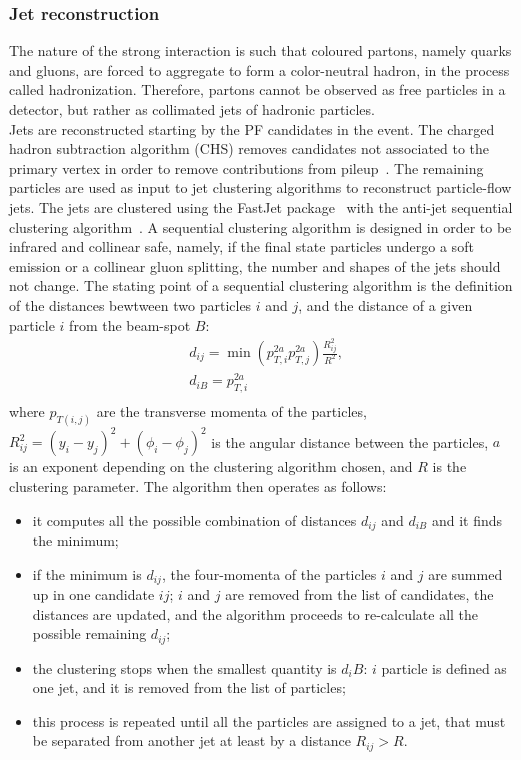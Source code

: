 \subsubsection{Jet reconstruction}
The nature of the strong interaction is such that coloured partons, namely quarks and gluons, are forced to aggregate to form a color-neutral hadron, in the process called hadronization. Therefore, partons cannot be observed as free particles in a detector, but rather as collimated jets of hadronic particles.\\
Jets are reconstructed starting by the PF candidates in the event. The charged hadron subtraction algorithm (CHS) removes candidates not associated to the primary vertex in order to remove contributions from pileup~\cite{CMS-PAS-JME-14-001}. The remaining particles are used as input to jet clustering algorithms
to reconstruct particle-flow jets. The jets are clustered using the {\sc FastJet} package~\cite{bib:fastjet} with the anti-\kt jet sequential clustering algorithm~\cite{Cacciari:2008gp}. A sequential clustering algorithm is designed in order to be infrared and collinear safe, namely, if the final state particles undergo a soft emission or a collinear gluon splitting, the number and shapes of the jets should not change. The stating point of a sequential clustering algorithm is the definition of the distances bewtween two particles $i$ and $j$, and the distance of a given particle $i$ from the beam-spot $B$:
\begin{equation}
\begin{split}
& d_{ij} = \min \left( p_{T,i}^{2a} p_{T,j}^{2a} \right) \frac{R_{ij}^2}{R^2},\\
& d_{iB} = p_{T,i}^{2a}\\
\end{split}
\label{eq:dist_akt}
\end{equation}
where $p_{T(i,j)}$ are the transverse momenta of the particles, $R_{ij}^2 = \left( y_i -y_j \right)^2 + \left( \phi_i - \phi_j\right)^2$ is the angular distance between the particles, $a$ is an exponent depending on the clustering algorithm chosen, and $R$ is the clustering parameter. The algorithm then operates as follows:
\begin{itemize}
\item it computes all the possible combination of distances $d_{ij}$ and $d_{iB}$ and it finds the minimum;
\item if the minimum is $d_{ij}$, the four-momenta of the particles $i$ and $j$ are summed up in one candidate $ij$; $i$ and $j$ are removed from the list of candidates, the distances are updated, and the algorithm proceeds to re-calculate all the possible remaining $d_{ij}$;
\item the clustering stops when the smallest quantity is $d_iB$: $i$ particle is defined as one jet, and it is removed from the list of particles;
\item this process is repeated until all the particles are assigned to a jet, that must be separated from another jet at least by a distance $R_{ij} > R$.
\end{itemize}
